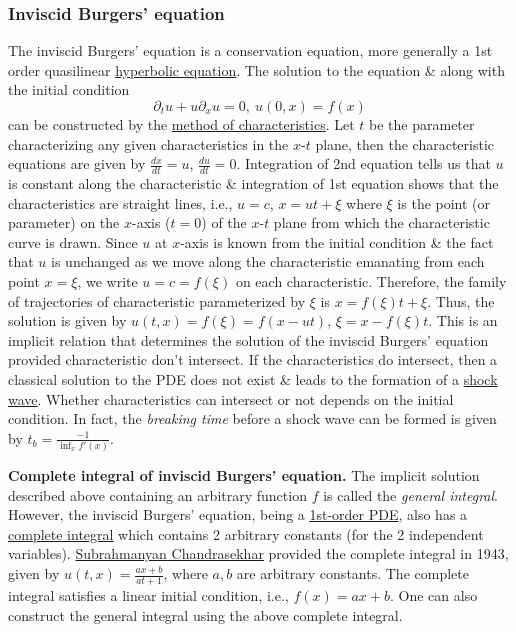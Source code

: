 \documentclass{article}
\begin{document}
\subsubsection{Inviscid Burgers' equation}
The inviscid Burgers' equation is a conservation equation, more generally a 1st order quasilinear \href{https://en.wikipedia.org/wiki/Hyperbolic_equation}{hyperbolic equation}. The solution to the equation \& along with the initial condition
\begin{equation}
	\label{inviscid Burgers}
	\partial_tu + u\partial_xu = 0,\ u(0,x) = f(x)
\end{equation}
can be constructed by the \href{https://en.wikipedia.org/wiki/Method_of_characteristics}{method of characteristics}. Let $t$ be the parameter characterizing any given characteristics in the $x$-$t$ plane, then the characteristic equations are given by $\frac{dx}{dt} = u$, $\frac{du}{dt} = 0$. Integration of 2nd equation tells us that $u$ is constant along the characteristic \& integration of 1st equation shows that the characteristics are straight lines, i.e., $u = c$, $x = ut + \xi$ where $\xi$ is the point (or parameter) on the $x$-axis ($t = 0$) of the $x$-$t$ plane from which the characteristic curve is drawn. Since $u$ at $x$-axis is known from the initial condition \& the fact that $u$ is unchanged as we move along the characteristic emanating from each point $x = \xi$, we write $u = c = f(\xi)$ on each characteristic. Therefore, the family of trajectories of characteristic parameterized by $\xi$ is $x = f(\xi)t + \xi$. Thus, the solution is given by $u(t,x) = f(\xi) = f(x - ut)$, $\xi = x - f(\xi)t$. This is an implicit relation that determines the solution of the inviscid Burgers' equation provided characteristic don't intersect. If the characteristics do intersect, then a classical solution to the PDE does not exist \& leads to the formation of a \href{https://en.wikipedia.org/wiki/Shock_wave}{shock wave}. Whether characteristics can intersect or not depends on the initial condition. In fact, the {\it breaking time} before a shock wave can be formed is given by $t_b = \frac{-1}{\inf_x f'(x)}$.

{\bf Complete integral of inviscid Burgers' equation.} The implicit solution described above containing an arbitrary function $f$ is called the {\it general integral}. However, the inviscid Burgers' equation, being a \href{https://en.wikipedia.org/wiki/First-order_partial_differential_equation}{1st-order PDE}, also has a \href{https://en.wikipedia.org/wiki/First-order_partial_differential_equation#general_integral_and_complete_integral}{complete integral} which contains 2 arbitrary constants (for the 2 independent variables). \href{https://en.wikipedia.org/wiki/Subrahmanyan_Chandrasekhar}{\sc Subrahmanyan Chandrasekhar} provided the complete integral in 1943, given by $u(t,x) = \frac{ax + b}{at + 1}$, where $a,b$ are arbitrary constants. The complete integral satisfies a linear initial condition, i.e., $f(x) = ax + b$. One can also construct the general integral using the above complete integral.
\end{document}
